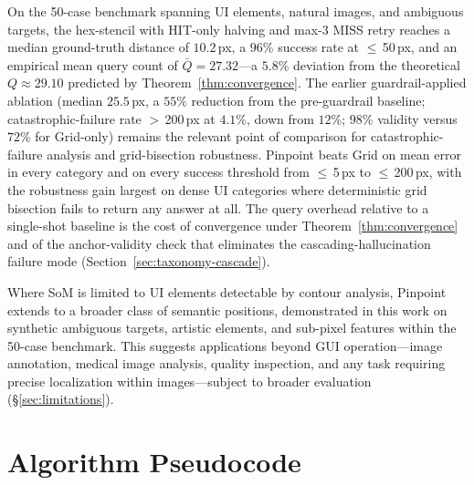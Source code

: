\documentclass[sigconf,nonacm]{acmart}
\begin{document}
On the 50-case benchmark spanning UI elements, natural images,
and ambiguous targets, the hex-stencil with HIT-only halving and
max-3 MISS retry reaches a median ground-truth distance of
$10.2$\,px, a $96\%$ success rate at $\leq$\,50\,px, and an
empirical mean query count of $\bar{Q}=27.32$---a $5.8\%$
deviation from the theoretical $Q\!\approx\!29.10$ predicted by
Theorem~\ref{thm:convergence}.  The earlier guardrail-applied
ablation (median $25.5$\,px, a $55\%$ reduction from the
pre-guardrail baseline; catastrophic-failure rate $>$\,200\,px at
$4.1\%$, down from $12\%$; $98\%$ validity versus $72\%$ for
Grid-only) remains the relevant point of comparison for
catastrophic-failure analysis and grid-bisection robustness.  Pinpoint beats Grid on mean error in every category
and on every success threshold from $\leq$\,5\,px to
$\leq$\,200\,px, with the robustness gain largest on dense UI
categories where deterministic grid bisection fails to return any
answer at all.  The query overhead relative to a single-shot
baseline is the cost of convergence under
Theorem~\ref{thm:convergence} and of the anchor-validity check that
eliminates the cascading-hallucination failure mode
(Section~\ref{sec:taxonomy-cascade}).

Where SoM is limited to UI elements detectable by contour analysis,
Pinpoint extends to a broader class of semantic positions,
demonstrated in this work on synthetic ambiguous targets, artistic
elements, and sub-pixel features within the 50-case benchmark.  This
suggests applications beyond GUI operation---image annotation, medical
image analysis, quality inspection, and any task requiring precise
localization within images---subject to broader evaluation
(\S\ref{sec:limitations}).






\appendix

\section{Algorithm Pseudocode}
\end{document}
